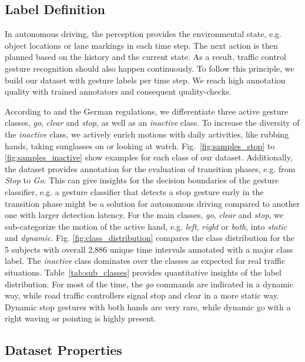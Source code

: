 \documentclass[letterpaper, 10 pt, conference]{ieeeconf}
\begin{document}
\subsection{Label Definition}

In autonomous driving, the perception provides the environmental state, e.g. object locations or lane markings in each time step. The next action is then planned based on the history and the current state. As a result, traffic control gesture recognition should also happen continuously. To follow this principle, we build our dataset with gesture labels per time step. We reach high annotation quality with trained annotators and consequent quality-checks.

According to \cite{Gupta2016ConventionalizedVehicles} and the German regulations, we differentiate three active gesture classes, \emph{go}, \emph{clear} and \emph{stop}, as well as an \emph{inactive} class. To increase the diversity of the \emph{inactive} class, we actively enrich motions with daily activities, like rubbing hands, taking sunglasses on or looking at watch. Fig.~\ref{fig:samples_stop} to \ref{fig:samples_inactive} show examples for each class of our dataset. Additionally, the dataset provides annotation for the evaluation of transition phases, e.g. from \emph{Stop} to \emph{Go}. This can give insights for the decision boundaries of the gesture classifier, e.g. a gesture classifier that detects a stop gesture early in the transition phase might be a solution for autonomous driving compared to another one with larger detection latency. For the main classes, \emph{go}, \emph{clear} and \emph{stop}, we sub-categorize the motion of the active hand, e.g. \emph{left}, \emph{right} or \emph{both}, into \emph{static} and \emph{dynamic}. Fig. \ref{fig:class_distribution} compares the class distribution for the 5 subjects with overall 2,886 unique time intervals annotated with a major class label. The \emph{inactive} class dominates over the classes as expected for real traffic situations. Table~\ref{tab:sub_classes} provides quantitative insights of the label distribution. For most of the time, the \emph{go} commands are indicated in a dynamic way, while road traffic controllers signal stop and clear in a more static way. Dynamic stop gestures with both hands are very rare, while dynamic go with a right waving or pointing is highly present. 

\subsection{Dataset Properties}
\end{document}
